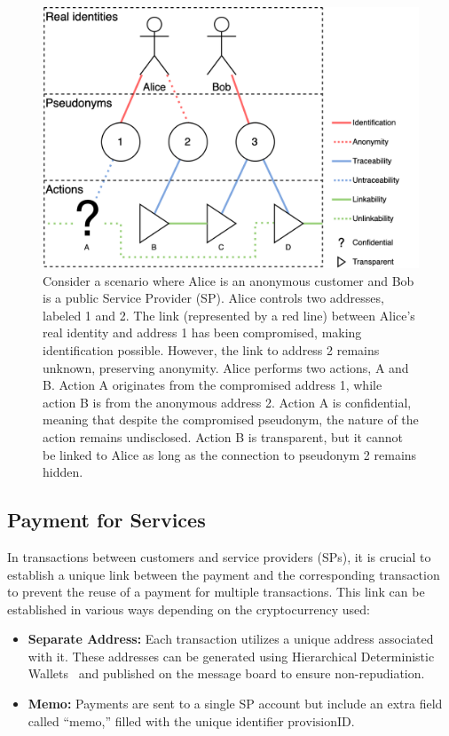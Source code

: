 \documentclass[pdftex,twocolumn,epjc3]{svjour3}
\begin{document}
\begin{figure}[h!]
\includegraphics[width=\linewidth]{anonymity-diagram.png}
\centering
\caption{Consider a scenario where Alice is an anonymous customer and Bob is a public Service Provider (SP). Alice controls two addresses, labeled 1 and 2. The link (represented by a red line) between Alice's real identity and address 1 has been compromised, making identification possible. However, the link to address 2 remains unknown, preserving anonymity. Alice performs two actions, A and B. Action A originates from the compromised address 1, while action B is from the anonymous address 2. Action A is confidential, meaning that despite the compromised pseudonym, the nature of the action remains undisclosed. Action B is transparent, but it cannot be linked to Alice as long as the connection to pseudonym 2 remains hidden.}
\label{fig:anonymity-diagram}
\end{figure}

\subsection{Payment for Services}\label{payment-for-services}

\begin{sloppypar}
In transactions between customers and service providers (SPs), it is crucial to establish a unique link between the payment and the corresponding transaction to prevent the reuse of a payment for multiple transactions. This link can be established in various ways depending on the cryptocurrency used:
\end{sloppypar}

\begin{sloppypar}
\begin{itemize}
    \item \textbf{Separate Address:} Each transaction utilizes a unique address associated with it. These addresses can be generated using Hierarchical Deterministic Wallets~\cite{wuilleBIP32HierarchicalDeterministic2012} and published on the message board to ensure non-repudiation.
    \item \textbf{Memo:} Payments are sent to a single SP account but include an extra field called ``memo,'' filled with the unique identifier $\textrm{provisionID}$.
\end{itemize}
\end{sloppypar}
\end{document}
